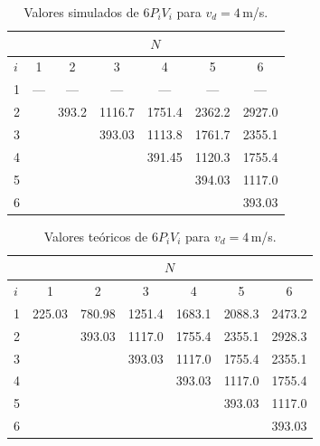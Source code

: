 \begin{table}[h!]
\caption {Valores simulados de $6P_iV_i$ para $v_d=4\,$m/s.}
\label{simulados}
\begin{center}
\begin{tabular}{|l|cccccc|}
\hline
      & \multicolumn{6}{c|}{$N$} \\
\hline
$i$   &  1   &   2    &  3       &  4     &  5     &   6     \\
\hline
 1    &  --- &  ---   &  ---     & ---    & ---    & ---     \\
 2    &      &  393.2 &  1116.7  & 1751.4 & 2362.2 & 2927.0  \\
 3    &      &        &  393.03  & 1113.8 & 1761.7 & 2355.1  \\
 4    &      &        &          & 391.45 & 1120.3 & 1755.4  \\
 5    &      &        &          &        & 394.03 & 1117.0  \\
 6    &      &        &          &        &        & 393.03  \\
\hline
\end{tabular}
\end{center}
\end{table}



\begin{table}[h!]
\caption {Valores teóricos de $6P_iV_i$ para $v_d=4\,$m/s.}
\label{teoricos}
\begin{center}
\begin{tabular}{|l|cccccc|}
\hline
      & \multicolumn{6}{c|}{$N$} \\
\hline
$i$   &  1         &   2        &  3       &  4     &  5     &   6   \\
\hline
 1    &  225.03    &  780.98    &  1251.4  & 1683.1 & 2088.3 & 2473.2 \\
 2    &            &  393.03    &  1117.0  & 1755.4 & 2355.1 & 2928.3 \\
 3    &            &            &  393.03  & 1117.0 & 1755.4 & 2355.1 \\
 4    &            &            &          & 393.03 & 1117.0 & 1755.4 \\
 5    &            &            &          &        & 393.03 & 1117.0 \\
 6    &            &            &          &        &        & 393.03 \\
\hline
\end{tabular}
\end{center}
\end{table}


